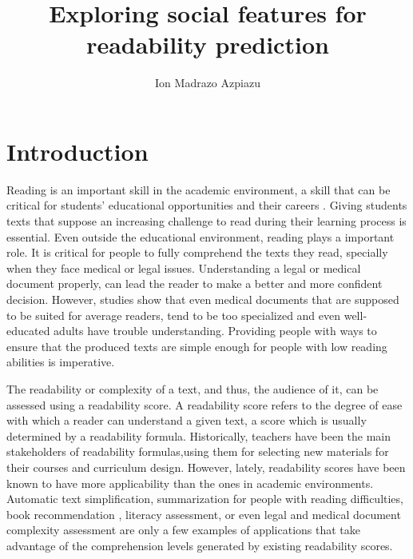 \documentclass[11pt,twocolumn]{article}
\title{Exploring social features for readability prediction}
\author{Ion Madrazo Azpiazu}
\date{\vspace{-5ex}}
\begin{document}
\maketitle
\section{Introduction}

Reading is an important skill in the academic environment, a skill that can be critical for students' educational opportunities and their careers \cite{robinson2000issues}. Giving students texts that suppose an increasing challenge to read during their learning process is essential. Even outside the educational environment, reading plays a important role. It is critical for people to fully comprehend the texts they read, specially when they face medical or legal issues. Understanding a legal or medical document properly, can lead the reader to make a better and more confident decision. However, studies\cite{medicalReadability1,medicalReadability2,medicalReadability3}  show that even medical documents that are supposed to be suited for average readers, tend to be too specialized and even well-educated adults have trouble understanding. Providing people with ways to ensure that the produced texts are simple enough for people with low reading abilities is imperative.



The readability or complexity of a text, and thus, the audience of it, can be assessed using a readability score. A readability score refers to the degree of ease with which a reader can understand a given text, a score which is usually determined by a readability formula. Historically, teachers have been the main stakeholders of readability formulas,using them for selecting new materials for their courses and curriculum design. However, lately, readability scores have been known to have more applicability than the ones in academic environments. Automatic text simplification\cite{textsimplification1,textsimplification2}, summarization for people with reading difficulties\cite{textsimplificationWithDisabilities1}, book recommendation \cite{pera2014automating}, literacy assessment\cite{literacy1}, or even legal\cite{legalreadability} and medical document complexity assessment\cite{medicalReadability1,medicalReadability2,medicalReadability3}  are only a few examples of applications that take advantage of the comprehension levels generated by existing readability scores.
\end{document}
